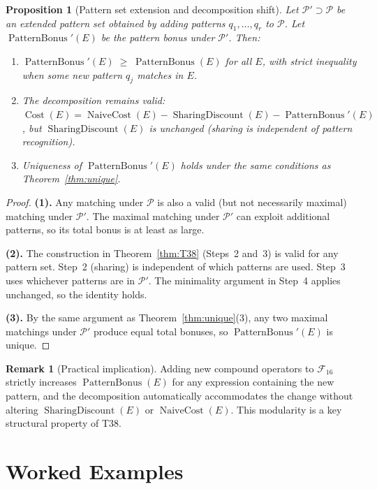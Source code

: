 \documentclass[12pt,a4paper]{article}
\newtheorem{proposition}[theorem]{Proposition}
\theoremstyle{definition}
\newtheorem{remark}[theorem]{Remark}
\newcommand{\Cost}{\operatorname{Cost}}
\newcommand{\NC}{\operatorname{NaiveCost}}
\newcommand{\SD}{\operatorname{SharingDiscount}}
\newcommand{\PB}{\operatorname{PatternBonus}}
\begin{document}
\begin{proposition}[Pattern set extension and decomposition shift]
\label{prop:extension}
Let $\mathcal{P}' \supset \mathcal{P}$ be an extended pattern set obtained by
adding patterns $q_1, \ldots, q_r$ to $\mathcal{P}$.  Let
$\PB'(E)$ be the pattern bonus under $\mathcal{P}'$.  Then:
\begin{enumerate}
  \item $\PB'(E) \;\geq\; \PB(E)$ for all $E$,
        with strict inequality when some new pattern $q_j$ matches in $E$.
  \item The decomposition remains valid:
        $\Cost(E) = \NC(E) - \SD(E) - \PB'(E)$,
        but $\SD(E)$ is unchanged (sharing is independent of pattern
        recognition).
  \item Uniqueness of $\PB'(E)$ holds under the same conditions as
        Theorem~\ref{thm:unique}.
\end{enumerate}
\end{proposition}

\begin{proof}
\textbf{(1).}
Any matching under $\mathcal{P}$ is also a valid (but not necessarily maximal)
matching under $\mathcal{P}'$.  The maximal matching under $\mathcal{P}'$ can
exploit additional patterns, so its total bonus is at least as large.

\textbf{(2).}
The construction in Theorem~\ref{thm:T38} (Steps~2 and~3) is valid for any
pattern set.  Step~2 (sharing) is independent of which patterns are used.
Step~3 uses whichever patterns are in $\mathcal{P}'$.  The minimality argument
in Step~4 applies unchanged, so the identity holds.

\textbf{(3).}
By the same argument as Theorem~\ref{thm:unique}(3), any two maximal matchings
under $\mathcal{P}'$ produce equal total bonuses, so $\PB'(E)$ is unique.
\end{proof}

\begin{remark}[Practical implication]
Adding new compound operators to $\mathcal{F}_{16}$ strictly increases
$\PB(E)$ for any expression containing the new pattern, and the decomposition
automatically accommodates the change without altering $\SD(E)$ or $\NC(E)$.
This modularity is a key structural property of T38.
\end{remark}

\section{Worked Examples}
\label{sec:examples}
\end{document}

